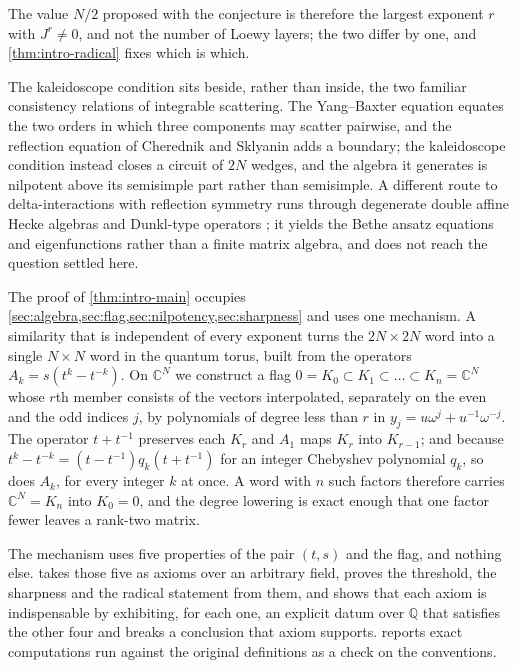 \documentclass[11pt,reqno]{amsart}
\theoremstyle{plain}
\theoremstyle{definition}
\theoremstyle{remark}
\numberwithin{equation}{section}
\begin{document}
The value $N/2$ proposed with the conjecture is therefore the largest exponent
$r$ with $J^{r}\ne0$, and not the number of Loewy layers; the two differ by
one, and \cref{thm:intro-radical} fixes which is which.

The kaleidoscope condition sits beside, rather than inside, the two familiar
consistency relations of integrable scattering. The Yang--Baxter equation
equates the two orders in which three components may scatter pairwise, and the
reflection equation of Cherednik \cite{Cherednik_1984fp} and Sklyanin
\cite{Sklyanin_1988bc} adds a boundary; the kaleidoscope condition instead
closes a circuit of $2N$ wedges, and the algebra it generates is nilpotent
above its semisimple part rather than semisimple. A different route to
delta-interactions with reflection symmetry runs through degenerate double
affine Hecke algebras and Dunkl-type operators \cite{Emsiz_2006pi}; it yields
the Bethe ansatz equations and eigenfunctions rather than a finite matrix
algebra, and does not reach the question settled here.

The proof of \cref{thm:intro-main} occupies
\cref{sec:algebra,sec:flag,sec:nilpotency,sec:sharpness} and uses one
mechanism. A similarity that is independent of every exponent turns the
$2N\times2N$ word into a single $N\times N$ word in the quantum torus, built
from the operators $A_{k}=s(t^{k}-t^{-k})$. On $\mathbb{C}^{N}$ we construct a
flag $0=K_{0}\subset K_{1}\subset\dots\subset K_{n}=\mathbb{C}^{N}$ whose $r$th
member consists of the vectors interpolated, separately on the even and the odd
indices $j$, by polynomials of degree less than $r$ in
$y_{j}=u\omega^{j}+u^{-1}\omega^{-j}$. The operator $t+t^{-1}$ preserves each
$K_{r}$ and $A_{1}$ maps $K_{r}$ into $K_{r-1}$; and because
$t^{k}-t^{-k}=(t-t^{-1})q_{k}(t+t^{-1})$ for an integer Chebyshev polynomial
$q_{k}$, so does $A_{k}$, for every integer $k$ at once. A word with $n$ such
factors therefore carries $\mathbb{C}^{N}=K_{n}$ into $K_{0}=0$, and the
degree lowering is exact enough that one factor fewer leaves a rank-two
matrix.

The mechanism uses five properties of the pair $(t,s)$ and the flag, and
nothing else.  takes those five as axioms over an arbitrary
field, proves the threshold, the sharpness and the radical statement from them,
and shows that each axiom is indispensable by exhibiting, for each one, an
explicit datum over $\mathbb{Q}$ that satisfies the other four and breaks a
conclusion that axiom supports.  reports exact
computations run against the original definitions as a check on the
conventions.
\end{document}
